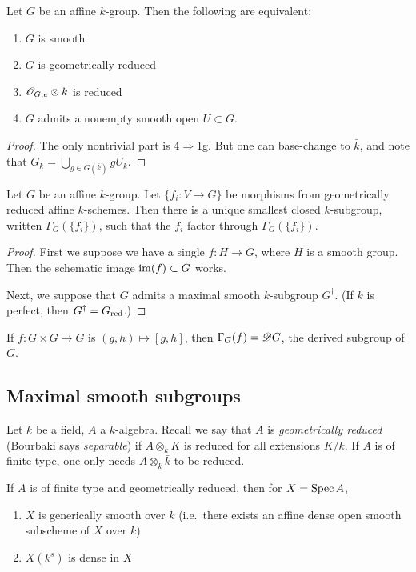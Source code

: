 \documentclass{article}
\begin{document}
\begin{lemma}
Let $G$ be an affine $k$-group. Then the following are equivalent: 
\begin{enumerate}
  \item $G$ is smooth 
  \item $G$ is geometrically reduced 
  \item $\mathscr{O}_{G,e}\otimes \bar k$ is reduced 
  \item $G$ admits a nonempty smooth open $U\subset G$. 
\end{enumerate}
\end{lemma}
\begin{proof}
The only nontrivial part is 4$\Rightarrow$1g. But one can base-change to 
$\bar k$, and note that $G_{\bar k}=\bigcup_{g\in G(\bar k)} g U_{\bar k}$. 
\end{proof}

\begin{proposition}
Let $G$ be an affine $k$-group. Let $\{f_i:V\to G\}$ be morphisms from 
geometrically reduced affine $k$-schemes. Then there is a unique smallest 
closed $k$-subgroup, written $\Gamma_G(\{f_i\})$, such that the $f_i$ 
factor through $\Gamma_G(\{f_i\})$. 
\end{proposition}
\begin{proof}
First we suppose we have a single $f:H\to G$, where $H$ is a smooth group. 
Then the schematic image $\operatorname{im}(f)\subset G$ works. 

Next, we suppose that $G$ admits a maximal smooth $k$-subgroup $G^\dag$. (If 
$k$ is perfect, then $G^\dag=G_{\mathrm{red}}$.) 
\end{proof}

If $f:G\times G\to G$ is 
$(g,h)\mapsto [g,h]$, then $\Gamma_G(f) = \mathscr{D} G$, the derived subgroup of 
$G$. 


\subsection{Maximal smooth subgroups}

Let $k$ be a field, $A$ a $k$-algebra. Recall we say that $A$ is 
\emph{geometrically reduced} (Bourbaki says \emph{separable}) if 
$A\otimes_k K$ is reduced for all extensions $K/k$. If $A$ is of finite 
type, one only needs $A\otimes_k \bar k$ to be reduced. 

If $A$ is of finite type and geometrically reduced, then for $X=\operatorname{Spec} A$, 
\begin{enumerate}
  \item $X$ is generically smooth over $k$ (i.e.\ there exists an 
    affine dense open smooth subscheme of $X$ over $k$)
  \item $X(k^s)$ is dense in $X$ 
\end{enumerate}
\end{document}
